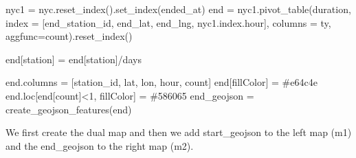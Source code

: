 \documentclass[
  letterpaper,
  DIV=11,
  numbers=noendperiod]{scrreprt}
\newenvironment{Shaded}{\begin{snugshade}}{\end{snugshade}}
\newcommand{\DecValTok}[1]{\textcolor[rgb]{0.68,0.00,0.00}{#1}}
\newcommand{\NormalTok}[1]{\textcolor[rgb]{0.00,0.23,0.31}{#1}}
\newcommand{\OperatorTok}[1]{\textcolor[rgb]{0.37,0.37,0.37}{#1}}
\newcommand{\StringTok}[1]{\textcolor[rgb]{0.13,0.47,0.30}{#1}}
\begin{document}
\begin{Shaded}
\begin{Highlighting}[]
\NormalTok{nyc1 }\OperatorTok{=}\NormalTok{ nyc.reset\_index().set\_index(}\StringTok{\textquotesingle{}ended\_at\textquotesingle{}}\NormalTok{)}
\NormalTok{end }\OperatorTok{=}\NormalTok{ nyc1.pivot\_table(}\StringTok{\textquotesingle{}duration\textquotesingle{}}\NormalTok{, }
\NormalTok{                     index }\OperatorTok{=}\NormalTok{ [}\StringTok{\textquotesingle{}end\_station\_id\textquotesingle{}}\NormalTok{, }
                              \StringTok{\textquotesingle{}end\_lat\textquotesingle{}}\NormalTok{, }
                              \StringTok{\textquotesingle{}end\_lng\textquotesingle{}}\NormalTok{, }
\NormalTok{                              nyc1.index.hour],}
\NormalTok{                     columns }\OperatorTok{=} \StringTok{\textquotesingle{}ty\textquotesingle{}}\NormalTok{,}
\NormalTok{                     aggfunc}\OperatorTok{=}\StringTok{\textquotesingle{}count\textquotesingle{}}\NormalTok{).reset\_index()}

\NormalTok{end[}\StringTok{\textquotesingle{}station\textquotesingle{}}\NormalTok{] }\OperatorTok{=}\NormalTok{ end[}\StringTok{\textquotesingle{}station\textquotesingle{}}\NormalTok{]}\OperatorTok{/}\NormalTok{days}

\NormalTok{end.columns }\OperatorTok{=}\NormalTok{ [}\StringTok{\textquotesingle{}station\_id\textquotesingle{}}\NormalTok{, }\StringTok{\textquotesingle{}lat\textquotesingle{}}\NormalTok{, }\StringTok{\textquotesingle{}lon\textquotesingle{}}\NormalTok{, }\StringTok{\textquotesingle{}hour\textquotesingle{}}\NormalTok{, }\StringTok{\textquotesingle{}count\textquotesingle{}}\NormalTok{]}
\NormalTok{end[}\StringTok{\textquotesingle{}fillColor\textquotesingle{}}\NormalTok{] }\OperatorTok{=} \StringTok{\textquotesingle{}\#e64c4e\textquotesingle{}}
\NormalTok{end.loc[end[}\StringTok{\textquotesingle{}count\textquotesingle{}}\NormalTok{]}\OperatorTok{\textless{}}\DecValTok{1}\NormalTok{, }\StringTok{\textquotesingle{}fillColor\textquotesingle{}}\NormalTok{] }\OperatorTok{=} \StringTok{\textquotesingle{}\#586065\textquotesingle{}}
\NormalTok{end\_geojson }\OperatorTok{=}\NormalTok{ create\_geojson\_features(end)}
\end{Highlighting}
\end{Shaded}

We first create the dual map and then we add start\_geojson to the left
map (m1) and the end\_geojson to the right map (m2).
\end{document}
